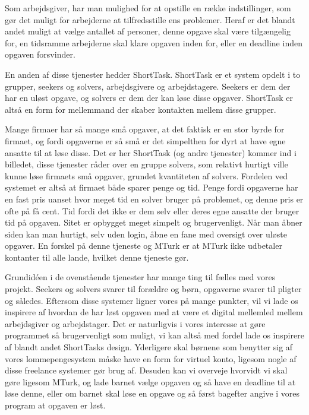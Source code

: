 Som arbejdsgiver, har man mulighed for at opstille en række indstillinger, som gør det muligt for arbejderne at tilfredsstille ens problemer. Heraf er det blandt andet muligt at vælge antallet af personer, denne opgave skal være tilgængelig for, en tidsramme arbejderne skal klare opgaven inden for, eller en deadline inden opgaven forsvinder.

En anden af disse tjenester hedder ShortTask. ShortTask er et system opdelt i to grupper, seekers og solvers, arbejdsgivere og arbejdstagere. Seekers er dem der har en uløst opgave, og solvers er dem der kan løse disse opgaver. ShortTask er altså en form for mellemmand der skaber kontakten mellem disse grupper.

Mange firmaer har så mange små opgaver, at det faktisk er en stor byrde for firmaet, og fordi opgaverne er så små er det simpelthen for dyrt at have egne ansatte til at løse disse. Det er her ShortTask (og andre tjenester) kommer ind i billedet, disse tjenester råder over en gruppe solvers, som relativt hurtigt ville kunne løse firmaets små opgaver, grundet kvantiteten af solvers. Fordelen ved systemet er altså at firmaet både sparer penge og tid. Penge fordi opgaverne har en fast pris uanset hvor meget tid en solver bruger på problemet, og denne pris er ofte på få cent. Tid fordi det ikke er dem selv eller deres egne ansatte der bruger tid på opgaven. Sitet er opbygget meget simpelt og brugervenligt. Når man åbner siden kan man hurtigt, selv uden login, åbne en fane med oversigt over uløste opgaver. En forskel på denne tjeneste og MTurk er at MTurk ikke udbetaler kontanter til alle lande, hvilket denne tjeneste gør. \cite{ShortTask}

Grundidéen i de ovenstående tjenester har mange ting til fælles med vores projekt. Seekers og solvers svarer til forældre og børn, opgaverne svarer til pligter og således. Eftersom disse systemer ligner vores på mange punkter, vil vi lade os inspirere af hvordan de har løst opgaven med at være et digital mellemled mellem arbejdsgiver og arbejdstager. Det er naturligvis i vores interesse at gøre programmet så brugervenligt som muligt, vi kan altså med fordel lade os inspirere af blandt andet ShortTasks design. Yderligere skal børnene som benytter sig af vores lommepengesystem måske have en form for virtuel konto, ligesom nogle af disse freelance systemer gør brug af. Desuden kan vi overveje hvorvidt vi skal gøre ligesom MTurk, og lade barnet vælge opgaven og så have en deadline til at løse denne, eller om barnet skal løse en opgave og så først bagefter angive i vores program at opgaven er løst.


